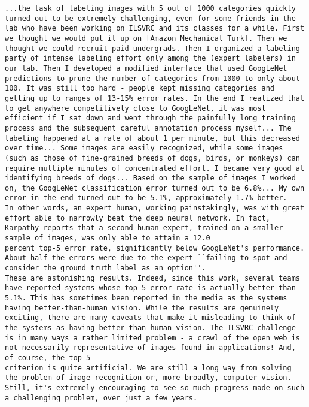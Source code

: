 \begin{lstlisting}
...the task of labeling images with 5 out of 1000 categories quickly turned out to be extremely challenging, even for some friends in the lab who have been working on ILSVRC and its classes for a while. First we thought we would put it up on [Amazon Mechanical Turk]. Then we thought we could recruit paid undergrads. Then I organized a labeling party of intense labeling effort only among the (expert labelers) in our lab. Then I developed a modified interface that used GoogLeNet predictions to prune the number of categories from 1000 to only about 100. It was still too hard - people kept missing categories and getting up to ranges of 13-15% error rates. In the end I realized that to get anywhere competitively close to GoogLeNet, it was most efficient if I sat down and went through the painfully long training process and the subsequent careful annotation process myself... The labeling happened at a rate of about 1 per minute, but this decreased over time... Some images are easily recognized, while some images (such as those of fine-grained breeds of dogs, birds, or monkeys) can require multiple minutes of concentrated effort. I became very good at identifying breeds of dogs... Based on the sample of images I worked on, the GoogLeNet classification error turned out to be 6.8%... My own error in the end turned out to be 5.1%, approximately 1.7% better. 
In other words, an expert human, working painstakingly, was with great effort able to narrowly beat the deep neural network. In fact, Karpathy reports that a second human expert, trained on a smaller sample of images, was only able to attain a 12.0
percent top-5 error rate, significantly below GoogLeNet's performance. About half the errors were due to the expert ``failing to spot and consider the ground truth label as an option''.
These are astonishing results. Indeed, since this work, several teams have reported systems whose top-5 error rate is actually better than 5.1%. This has sometimes been reported in the media as the systems having better-than-human vision. While the results are genuinely exciting, there are many caveats that make it misleading to think of the systems as having better-than-human vision. The ILSVRC challenge is in many ways a rather limited problem - a crawl of the open web is not necessarily representative of images found in applications! And, of course, the top-5
criterion is quite artificial. We are still a long way from solving the problem of image recognition or, more broadly, computer vision. Still, it's extremely encouraging to see so much progress made on such a challenging problem, over just a few years.

\end{lstlisting}
